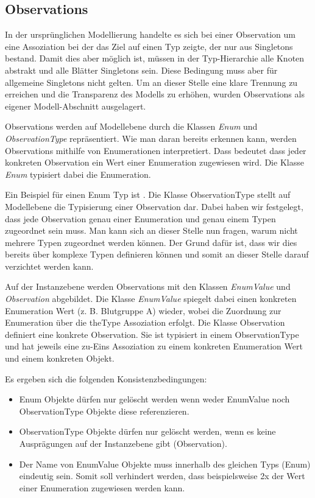 \subsection{Observations}\label{Observations}
In der ursprünglichen Modellierung handelte es sich bei einer Observation um eine Assoziation bei der das Ziel auf einen 
Typ zeigte, der nur aus Singletons bestand. Damit dies aber möglich ist, müssen in der Typ-Hierarchie alle Knoten 
abstrakt und alle Blätter Singletons sein. Diese Bedingung muss aber für allgemeine Singletons nicht gelten. Um an dieser 
Stelle eine klare Trennung zu erreichen und die Transparenz des Modells zu erhöhen, wurden Observations als eigener Modell-Abschnitt ausgelagert.


Observations werden auf Modellebene durch die Klassen \emph{Enum} und \emph{ObservationType} repräsentiert. 
Wie man daran bereits erkennen kann, werden Observations mithilfe von Enumerationen interpretiert. 
Dass bedeutet dass jeder konkreten Observation ein Wert einer Enumeration zugewiesen wird. 
Die Klasse \emph{Enum} typisiert dabei die Enumeration. 

Ein Beispiel für einen Enum Typ ist . Die Klasse ObservationType stellt auf Modellebene die 
Typisierung einer Observation dar. Dabei haben wir festgelegt, dass jede Observation genau einer Enumeration 
und genau einem Typen zugeordnet sein muss. Man kann sich an dieser Stelle nun fragen, warum nicht mehrere Typen 
zugeordnet werden können. Der Grund dafür ist, dass wir dies bereits über komplexe Typen definieren können und somit 
an dieser Stelle darauf verzichtet werden kann.

Auf der Instanzebene werden Observations mit den Klassen \emph{EnumValue} und \emph{Observation} abgebildet. 
Die Klasse \emph{EnumValue} spiegelt dabei einen konkreten Enumeration Wert (z. B. Blutgruppe A) wieder, 
wobei die Zuordnung zur Enumeration über die theType Assoziation erfolgt. 
Die Klasse Observation definiert eine konkrete Observation. 
Sie ist typisiert in einem ObservationType und hat jeweils eine zu-Eins Assoziation zu einem konkreten Enumeration Wert 
und einem konkreten Objekt.

Es ergeben sich die folgenden Konsistenzbedingungen:
\begin{itemize}
  \item Enum Objekte dürfen nur gelöscht werden wenn weder EnumValue noch ObservationType Objekte diese referenzieren.
  \item ObservationType Objekte dürfen nur gelöscht werden, wenn es keine Ausprägungen auf der Instanzebene gibt (Observation).
  \item Der Name von EnumValue Objekte muss innerhalb des gleichen Typs (Enum) eindeutig sein. Somit soll verhindert werden, dass beispielsweise 2x der Wert  einer Enumeration  zugewiesen werden kann.
\end{itemize}

